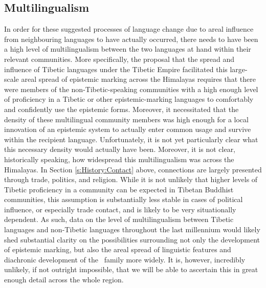 \subsection{Multilingualism}
In order for these suggested processes of language change due to areal influence from neighbouring languages to have actually occurred, there needs to have been a high level of multilingualism between the two languages at hand within their relevant communities. More specifically, the proposal that the spread and influence of Tibetic languages under the Tibetic Empire facilitated this large-scale areal spread of epistemic marking across the Himalayas requires that there were members of the non-Tibetic-speaking communities with a high enough level of proficiency in a Tibetic or other epistemic-marking languages to comfortably and confidently use the epistemic forms. Moreover, it necessitated that the density of these multilingual community members was high enough for a local innovation of an epistemic system to actually enter common usage and survive within the recipient language. Unfortunately, it is not yet particularly clear what this necessary density would actually have been. Moreover, it is not clear, historically speaking, how widespread this multilingualism was across the Himalayas. In Section \ref{s:History:Contact} above, connections are largely presented through trade, politics, and religion. While it is not unlikely that higher levels of Tibetic proficiency in a community can be expected in Tibetan Buddhist communities, this assumption is substantially less stable in cases of political influence, or especially trade contact, and is likely to be very situationally dependent. As such, data on the level of multilingualism between Tibetic languages and non-Tibetic languages throughout the last millennium would likely shed substantial clarity on the possibilities surrounding not only the development of epistemic marking, but also the areal spread of linguistic features and diachronic development of the \lfam\ family more widely. It is, however, incredibly unlikely, if not outright impossible, that we will be able to ascertain this in great enough detail across the whole region.
